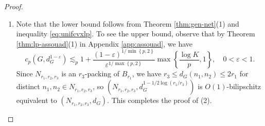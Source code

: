 \documentclass[11pt,reqno]{amsart}
\newcommand{\1}{\mathbf 1}
\begin{document}
\begin{proof}
\begin{enumerate}
\begin{align*}
&\ge d\left(x,x\exp\left(tv\right)\right)-d\left(x,n_1\right)-d\left(x\exp\left(tv\right),n_2\right)-2C Dr_2\log K\\
&\stackrel{\mathclap{\eqref{eq:rho-ineq-double-second}}}{\ge} \left(c_1t^{1/\rho}-2r_2\right)-2CDr_2\log K>\frac {c_1}2 t^{1/\rho},
\end{align*}
where in the last inequality we used that $t>\left(\frac{\left(4+4CD\log K\right)r_2}{c_1}\right)^{\rho}$.
Thus
\begin{align*}
&\left(\int_0^\infty \int_{G}\left(\frac{\left\|\phi\left(h\exp\left(tv\right)\right)-\phi\left(h\right)\right\|_X}{t^{1/\rho}}\right)^qd\mu\left(h\right)\frac{dt}{t}\right)^{1/q} \ge \left(\int_{\left(\frac{\left(4+4CD\log K\right)r_2}{c_1}\right)^{\rho}}^{\left(r_1/2\right)^\rho}\int_{B_{r_1/2}} \frac{c_1^q}{2^q}d\mu\left(h\right) \frac{dt}{t}\right)^{1/q}\\
&\ge \frac {c_1\rho^{1/q}}2 \left(\log\left(r_1/r_2\right)-\log\left(\frac{8+8CD\log K}{c_1}\right)\right)^{1/q}\mu\left(B_{r_1/2}\right)^{1/q}.
\end{align*}
Thus by Theorem \ref{thm:cvx} with $p=q$,
\[
\frac {c_1\rho^{1/q}}2 \left(\log\left(r_1/r_2\right)-\log\left(\frac{8+8CD\log K}{c_1}\right)\right)^{1/q}\mu\left(B_{r_1/2}\right)^{1/q}\lesssim \sqrt{k}\left(\rho+\frac{1}{\rho-1}\right)K_q\left(X\right)D\left(\log K\right) \mu\left(B_{2r_1}\right)^{1/q}.
\]
But we may also assume $\log\left(r_1/r_2\right)-\log\left(\frac{8+8CD\log K}{c_1}\right)\ge \frac12 \log \left(r_1/r_2\right)$, for otherwise $D>\frac{c_1\sqrt{r_1/r_2}}{16C\log K}$ and the proof is complete. Thus
\[
c_1\rho^{1/q}\left(\log \left(r_1/r_2\right)\right)^{1/q}\lesssim \sqrt{k}\left(\rho+\frac{1}{\rho-1}\right)K_q\left(X\right)D K^{2/q}\log K,
\]
from which it follows that
\[
D\gtrsim \left(\frac{c_1\rho^{1/q}}{\sqrt{k}\left(\rho+\frac{1}{\rho-1}\right)K^{2/q}\log K}\right)\frac{\left(\log \left(r_1/r_2\right)\right)^{1/q}}{K_q\left(X\right)}.
\]

\item 
Note that the lower bound follows from Theorem \ref{thm:gen-net}(1) and inequality \eqref{eq:unifcvxlp}. To see the upper bound, observe that by Theorem \ref{thm:lp-assouad}(1) in Appendix \ref{app:assouad}, we have
\begin{equation*}
c_p\left(G,d_G^{1-\varepsilon}\right)\lesssim_{p} 1+\frac{(1-\varepsilon)^{1/\min\left\{p,2\right\}}}{\varepsilon^{1/\max\left\{p,2\right\}}}\max\left\{\frac{\log K}{p},1\right\},\quad 0<\varepsilon<1.
\end{equation*}
Since $N_{r_1,r_2,r_3}$ is an $r_3$-packing of $B_{r_1}$, we have $r_3\le d_G\left(n_1,n_2\right)\le 2r_1$ for distinct $n_1,n_2\in N_{r_1,r_2,r_3}$, so $\left(N_{r_1,r_2,r_3},d_G^{1-1/2\log \left(r_1/r_3\right)}\right)$ is $O\left(1\right)$-bilipschitz equivalent to $\left(N_{r_1,r_2,r_3},d_G\right)$. This completes the proof of (2).
\end{enumerate}
\end{proof}
\end{document}

